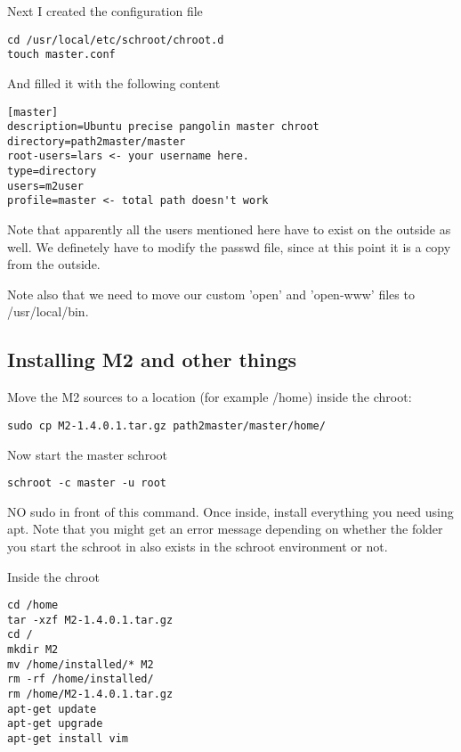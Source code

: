 \documentclass[a4paper]{book}
\begin{document}
Next I created the configuration file

\begin{verbatim}
cd /usr/local/etc/schroot/chroot.d
touch master.conf
\end{verbatim}

And filled it with the following content

\begin{verbatim}
[master]
description=Ubuntu precise pangolin master chroot
directory=path2master/master
root-users=lars <- your username here.
type=directory
users=m2user
profile=master <- total path doesn't work
\end{verbatim}

Note that apparently all the users mentioned here have to exist on the outside
as well.  We definetely have to modify the passwd file, since at this point it
is a copy from the outside.

Note also that we need to move our custom 'open' and 'open-www' files to /usr/local/bin.

\subsection{Installing M2 and other things}

Move the M2 sources to a location (for example /home) inside the chroot:

\begin{verbatim}
sudo cp M2-1.4.0.1.tar.gz path2master/master/home/
\end{verbatim}

Now start the master schroot

\begin{verbatim}
schroot -c master -u root
\end{verbatim}

NO sudo in front of this command. Once inside, install everything you need
using apt.  Note that you might get an error message depending on whether the
folder you start the schroot in also exists in the schroot environment or not.

Inside the chroot

\begin{verbatim}
cd /home
tar -xzf M2-1.4.0.1.tar.gz
cd /
mkdir M2
mv /home/installed/* M2
rm -rf /home/installed/
rm /home/M2-1.4.0.1.tar.gz
apt-get update
apt-get upgrade
apt-get install vim
\end{verbatim}
\end{document}
